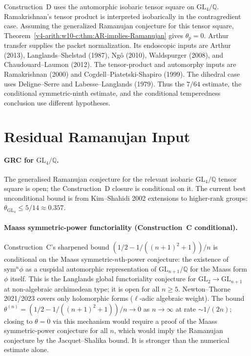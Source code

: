 Construction~D uses the automorphic isobaric tensor square on
\(\mathrm{GL}_{4}/\mathbb Q\). Ramakrishnan's tensor product is
interpreted isobarically in the contragredient case.
Assuming the generalized Ramanujan conjecture for this tensor
square, Theorem~\ref{v4-arith:w10-c:thm:AR-implies-Ramanujan} gives
\(\theta_p=0\). Arthur transfer supplies the packet normalization.
Its endoscopic inputs are Arthur (2013), Langlands--Shelstad (1987),
Ng\^o (2010), Waldspurger (2008), and Chaudouard--Laumon (2012).
The tensor-product and automorphy inputs are Ramakrishnan (2000)
and Cogdell--Piatetski-Shapiro (1999).
The dihedral case uses Deligne--Serre and Labesse--Langlands (1979).
Thus the \(7/64\) estimate, the conditional symmetric-ninth estimate,
and the conditional temperedness conclusion use different hypotheses.

\section{Residual Ramanujan Input}
\label{v4-arith:w10-c:open}

\paragraph{GRC for \(\mathrm{GL}_{4}/\mathbb{Q}\).}
The generalised Ramanujan conjecture for the relevant isobaric
\(\mathrm{GL}_{4}/\mathbb{Q}\) tensor square is open; the Construction~D
closure is conditional on it.
The current best unconditional bound is from Kim--Shahidi 2002
extensions to higher-rank groups:
\(\theta_{\mathrm{GL}_{4}}\leq 5/14\approx 0.357\).

\paragraph{Maass symmetric-power functoriality (Construction~C conditional).}
Construction~C's sharpened bound \((1/2-1/((n+1)^{2}+1))/n\) is conditional
on the Maass symmetric-\(n\)th-power conjecture: the existence of
\(\mathrm{sym}^{n}\phi\) as a cuspidal automorphic representation of
\(\mathrm{GL}_{n+1}/\mathbb{Q}\) for the Maass form \(\phi\) itself.
This is the Langlands global functoriality conjecture for
\(\mathrm{GL}_{2}\to\mathrm{GL}_{n+1}\) at non-algebraic archimedean
type; it is open for all \(n\geq 5\). Newton--Thorne 2021/2023 covers
only holomorphic forms (\(\ell\)-adic algebraic weight). The bound
\(\theta^{(n)}=(1/2-1/((n+1)^{2}+1))/n\to 0\) as \(n\to\infty\) at
rate \(\sim 1/(2n)\); closing to \(\theta=0\) via this mechanism would
require a proof of the Maass symmetric-power conjecture for all \(n\),
which would imply the Ramanujan conjecture by the Jacquet--Shalika
bound. It is stronger than the numerical estimate alone.

